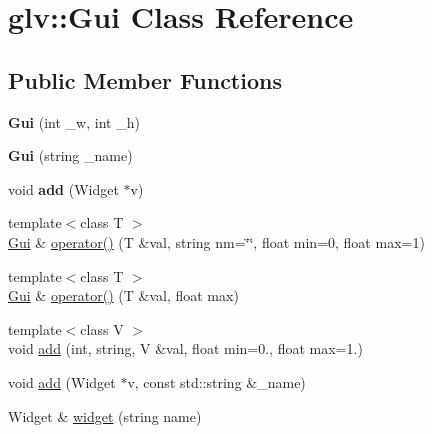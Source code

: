 \hypertarget{classglv_1_1_gui}{\section{glv\-:\-:Gui Class Reference}
\label{classglv_1_1_gui}
}
\subsection*{Public Member Functions}
\begin{DoxyCompactItemize}
\item 
\hypertarget{classglv_1_1_gui_ae98ba8c8c1f3ec625e2f2e2e59be7160}{{\bfseries Gui} (int \-\_\-w, int \-\_\-h)}\label{classglv_1_1_gui_ae98ba8c8c1f3ec625e2f2e2e59be7160}

\item 
\hypertarget{classglv_1_1_gui_a4c4c46ae4dfb1a285a4ba01739622f62}{{\bfseries Gui} (string \-\_\-name)}\label{classglv_1_1_gui_a4c4c46ae4dfb1a285a4ba01739622f62}

\item 
\hypertarget{classglv_1_1_gui_ac67c05b759aa183d2231803672324baf}{void {\bfseries add} (Widget $\ast$v)}\label{classglv_1_1_gui_ac67c05b759aa183d2231803672324baf}

\item 
{\footnotesize template$<$class T $>$ }\\\hyperlink{classglv_1_1_gui}{Gui} \& \hyperlink{classglv_1_1_gui_ad05b519428fcfa37ec02d10f212ba806}{operator()} (T \&val, string nm=\char`\"{}\char`\"{}, float min=0, float max=1)
\item 
{\footnotesize template$<$class T $>$ }\\\hyperlink{classglv_1_1_gui}{Gui} \& \hyperlink{classglv_1_1_gui_a5cef6144c49f3f2aa5f8d95cb318f724}{operator()} (T \&val, float max)
\item 
{\footnotesize template$<$class V $>$ }\\void \hyperlink{classglv_1_1_gui_aa7283b98dee158aaece9985726f84790}{add} (int, string, V \&val, float min=0., float max=1.)
\item 
void \hyperlink{classglv_1_1_gui_aaa1a71c78d35f50b09871cf435803cfe}{add} (Widget $\ast$v, const std\-::string \&\-\_\-name)
\item 
\hypertarget{classglv_1_1_gui_a064cb3678a8fd59863f63a702189590f}{Widget \& \hyperlink{classglv_1_1_gui_a064cb3678a8fd59863f63a702189590f}{widget} (string name)}\label{classglv_1_1_gui_a064cb3678a8fd59863f63a702189590f}


\end{DoxyCompactItemize}
